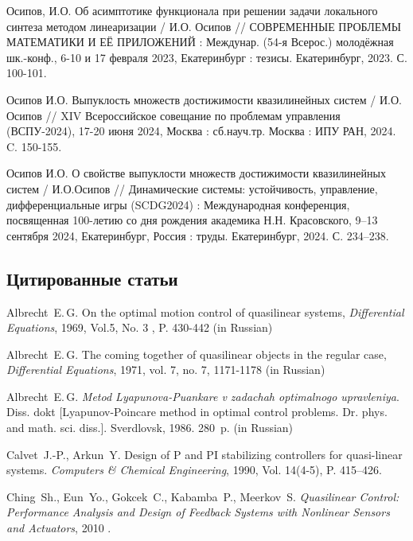 \documentclass[../main.tex]{subfiles}
\begin{document}
\begin{thebibliography}{99}
    Осипов, И.О. Об асимптотике функционала при решении задачи локального синтеза методом линеаризации / И.О. Осипов // СОВРЕМЕННЫЕ ПРОБЛЕМЫ МАТЕМАТИКИ И ЕЁ ПРИЛОЖЕНИЙ : Междунар. (54-я Всерос.) молодёжная шк.-конф., 6-10 и 17 февраля 2023, Екатеринбург : тезисы. Екатеринбург, 2023. С. 100-101. 
    
    Осипов И.О. Выпуклость множеств достижимости квазилинейных систем / И.О. Осипов // XIV Всероссийское совещание по проблемам управления (ВСПУ-2024), 17-20 июня 2024, Москва : сб.науч.тр. Москва : ИПУ РАН, 2024. C. 150-155.  
    
    Осипов И.О. О свойстве выпуклости множеств достижимости квазилинейных систем / И.О.Осипов // Динамические системы: устойчивость, управление, дифференциальные игры (SCDG2024) : Международная конференция, посвященная 100-летию со дня рождения академика Н.Н. Красовского, 9–13 сентября 2024, Екатеринбург, Россия : труды. Екатеринбург, 2024. С. 234–238.  


\subsection*{Цитированные статьи}

Albrecht~E.\,G. On the optimal motion control of quasilinear systems, \emph{Differential Equations}, 1969, Vol.5, No. 3 , P. 430-442 (in Russian)

Albrecht~E.\,G. The coming together of quasilinear objects in the regular case, \emph{Differential Equations}, 1971, vol. 7, no. 7, 1171-1178 (in Russian)

Albrecht~E.\,G. \emph{Metod Lyapunova-Puankare v zadachah optimalnogo upravleniya}. Diss.
dokt [Lyapunov-Poincare method in optimal control problems. Dr. phys. and math. sci. diss.].
Sverdlovsk, 1986. 280~p. (in Russian)

Calvet~J.-P., Arkun~Y. Design of P and PI stabilizing controllers for quasi-linear systems. \emph{Computers \& Chemical Engineering}, 1990, Vol. 14(4-5), P. 415–426. 

Ching~Sh., Eun~Yo., Gokcek~C., Kabamba~P., Meerkov~S. \emph{Quasilinear Control: Performance Analysis and Design of Feedback Systems with Nonlinear Sensors and Actuators}, 2010 . 


\end{thebibliography}
\end{document}
